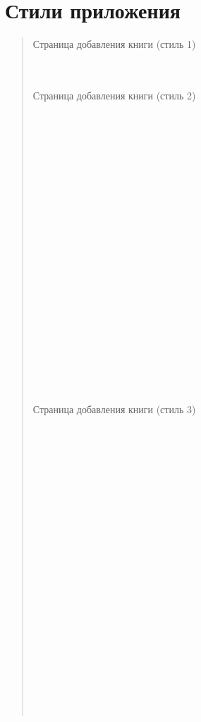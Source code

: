 \documentclass[letterpaper,10pt,russian]{sphinxmanual}
\begin{document}
\begin{quote}
\begin{sphinxVerbatim}[commandchars=\\\{\}]
\end{sphinxVerbatim}
\end{quote}


\chapter{Стили приложения}
\label{\detokenize{index:id2}}\begin{quote}

\sphinxAtStartPar
Страница добавления книги (стиль 1)

\noindent{}

\sphinxAtStartPar
\\
\\
Страница добавления книги (стиль 2)

\noindent{}

\sphinxAtStartPar
\\
\\
\\
\\
\\
\\
\\
\\
\\
\\
\\
\\
\\
\\
\\
\\
\\
\\
\\
\\
\\

Страница добавления книги (стиль 3)

\noindent{}

\sphinxAtStartPar
\\
\\
\\
\\
\\
\\
\\
\\
\\
\\
\\
\\
\\
\\
\\
\\
\\
\\
\\
\\
\\


\end{quote}
\end{document}
